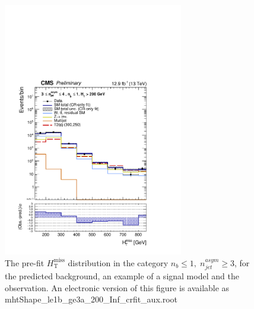 \clearpage
\begin{figure}[tbhp]
    \caption{ 
    The pre-fit $H_{\mathrm{T}}^{\mathrm{miss}}$ distribution in the category $n_{b}\leq 1, \; n_{jet}^{asym} \geq 3$, 
    for the predicted background, an example of a signal model and the observation.
    An electronic version of this figure is available as mhtShape\_le1b\_ge3a\_200\_Inf\_crfit\_aux.root
    \label{fig:mhtShape_le1b_ge3a_crfit} }
  \begin{center}
  \includegraphics[width=0.7\textwidth]{mhtShape_le1b_ge3a_200_Inf_crfit_aux}
  \end{center}
\end{figure}


